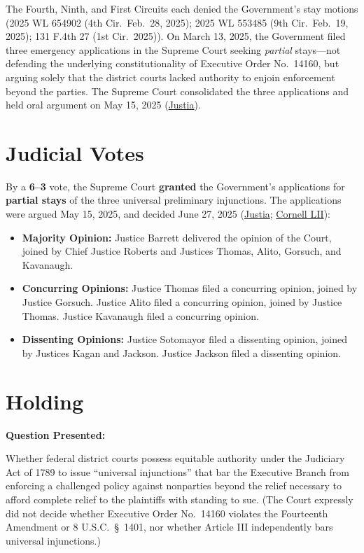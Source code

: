 \documentclass[12pt]{article}
\begin{document}
The Fourth, Ninth, and First Circuits each denied the Government's stay motions (2025 WL 654902 (4th Cir.\ Feb.\ 28, 2025); 2025 WL 553485 (9th Cir.\ Feb.\ 19, 2025); 131 F.4th 27 (1st Cir.\ 2025)). On March 13, 2025, the Government filed three emergency applications in the Supreme Court seeking \textit{partial} stays---not defending the underlying constitutionality of Executive Order No.\ 14160, but arguing solely that the district courts lacked authority to enjoin enforcement beyond the parties. The Supreme Court consolidated the three applications and held oral argument on May 15, 2025 (\href{https://supreme.justia.com/cases/federal/us/606/24a884/}{Justia}).

\section{Judicial Votes}
By a \textbf{6--3} vote, the Supreme Court \textbf{granted} the Government's applications for \textbf{partial stays} of the three universal preliminary injunctions. The applications were argued May 15, 2025, and decided June 27, 2025 (\href{https://supreme.justia.com/cases/federal/us/606/24a884/}{Justia}; \href{https://www.law.cornell.edu/supremecourt/text/24A884}{Cornell LII}):

\begin{itemize}
    \item \textbf{Majority Opinion:} Justice Barrett delivered the opinion of the Court, joined by Chief Justice Roberts and Justices Thomas, Alito, Gorsuch, and Kavanaugh.
    \item \textbf{Concurring Opinions:} Justice Thomas filed a concurring opinion, joined by Justice Gorsuch. Justice Alito filed a concurring opinion, joined by Justice Thomas. Justice Kavanaugh filed a concurring opinion.
    \item \textbf{Dissenting Opinions:} Justice Sotomayor filed a dissenting opinion, joined by Justices Kagan and Jackson. Justice Jackson filed a dissenting opinion.
\end{itemize}

\section{Holding}
\textbf{Question Presented:}

Whether federal district courts possess equitable authority under the Judiciary Act of 1789 to issue ``universal injunctions'' that bar the Executive Branch from enforcing a challenged policy against nonparties beyond the relief necessary to afford complete relief to the plaintiffs with standing to sue. (The Court expressly did not decide whether Executive Order No.\ 14160 violates the Fourteenth Amendment or 8 U.S.C.\ \S\ 1401, nor whether Article III independently bars universal injunctions.)
\end{document}
